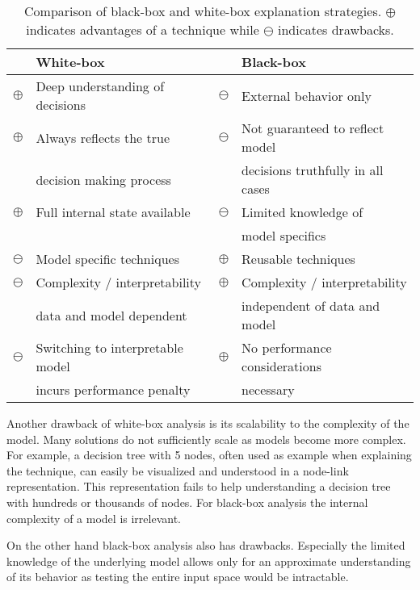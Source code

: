 \newcommand\Tstrut{\rule{0pt}{2.5ex}}
\begin{table}
     \begin{tabular}{cl|cl} 
     & \textbf{White-box} & & \textbf{Black-box} \\
     \hline
     \hline
    $\oplus$ & Deep understanding of decisions & $\ominus$ & External behavior only \Tstrut \\
    $\oplus$ & Always reflects the true & $\ominus$ & Not guaranteed to reflect model \Tstrut \\
    & decision making process & & decisions truthfully in all cases \\
    $\oplus$ & Full internal state available & $\ominus$ & Limited knowledge of \Tstrut \\
    & & & model specifics \\
    \hline
    $\ominus$ & Model specific techniques & $\oplus$ & Reusable techniques \Tstrut \\
    $\ominus$ & Complexity / interpretability & $\oplus$ & Complexity / interpretability \Tstrut \\ 
    & data and model dependent & & independent of data and model \\
    $\ominus$ & Switching to interpretable model & $\oplus$ & No performance considerations \Tstrut \\
    & incurs performance penalty & & necessary \\
    \end{tabular}
    \centering
    \vspace*{-0.5em}
    \caption{Comparison of black-box and white-box explanation strategies. $\oplus$ indicates advantages of a technique while $\ominus$ indicates drawbacks.}
    \vspace*{-0.75em}
    \label{tab:blackvswhite}
\end{table}

Another drawback of white-box analysis is its scalability to the complexity of the model. Many solutions do not sufficiently scale as models become more complex. For example, a decision tree with 5 nodes, often used as example when explaining the technique, can easily be visualized and understood in a node-link representation. This representation fails to help understanding a decision tree with hundreds or thousands of nodes. For black-box analysis the internal complexity of a model is irrelevant.

On the other hand black-box analysis also has drawbacks. Especially the limited knowledge of the underlying model allows only for an approximate understanding of its behavior as testing the entire input space would be intractable.

